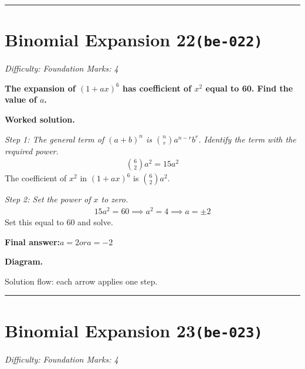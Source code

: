 \documentclass[11pt]{article}
\newcommand{\question}[1]{\par\medskip\noindent\textbf{#1}\par}
\begin{document}
\medskip\hrule

\section*{Binomial Expansion 22\quad\small\texttt{(be-022)}}
\textit{Difficulty: Foundation \quad\textbar\quad Marks: 4}

\question{The expansion of \( (1 + ax)^6 \) has coefficient of \( x^2 \) equal to 60. Find the value of \( a \).}

\textbf{Worked solution.}

\textit{Step 1: The general term of \((a+b)^n\) is \(\binom{n}{r} a^{n-r} b^r\). Identify the term with the required power.}
\[\begin{gathered}
\binom{6}{2} a^2 = 15a^2
\end{gathered}\]
The coefficient of \(x^2\) in \((1+ax)^6\) is \( \binom{6}{2} a^2 \).

\textit{Step 2: Set the power of \(x\) to zero.}
\[\begin{gathered}
15a^2 = 60 \implies a^2 = 4 \implies a = \pm 2
\end{gathered}\]
Set this equal to 60 and solve.

\begin{answerbox}
\textbf{Final answer:}\quad \(\displaystyle a = 2 or a = -2\)
\end{answerbox}
\textbf{Diagram.}

\begin{center}
\end{center}
\small Solution flow: each arrow applies one step.\normalsize

\medskip\hrule

\section*{Binomial Expansion 23\quad\small\texttt{(be-023)}}
\textit{Difficulty: Foundation \quad\textbar\quad Marks: 4}
\end{document}
